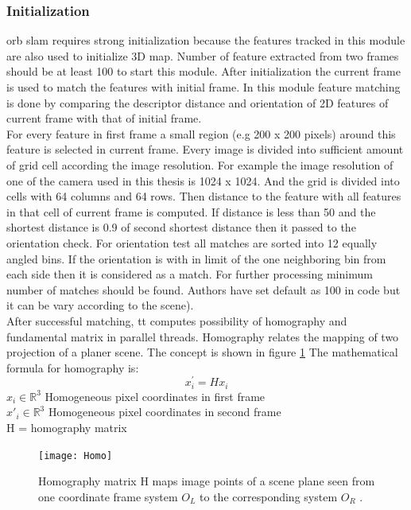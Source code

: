 \subsubsection{Initialization}
\acrshort{orb} \acrshort{slam} requires strong initialization because the features tracked in this module are also used to initialize 3D map. Number of feature extracted from two frames should be at least 100 to start this module. After initialization the current frame is used to match the features with initial frame. In this module feature matching is done by comparing the descriptor distance and orientation of 2D features of current frame with that of initial frame.\\
\linebreak
For every feature in first frame a small region (e.g 200 x 200 pixels) around this feature is selected in current frame. Every image is divided into sufficient amount of grid cell according the image resolution. For example the image resolution of one of the camera used in this thesis is 1024 x 1024. And the grid is divided into cells with 64 columns and 64 rows. Then distance to the feature with all features in that cell of current frame is computed. If distance is less than 50 and the shortest distance is 0.9 of second shortest distance then it passed to the orientation check. For orientation test all matches are sorted into 12 equally angled bins. If the orientation is with in limit of the one neighboring bin from each side then it is considered as a match. For further processing minimum number of matches should be found. Authors have set default as 100 in code but it can be vary according to the scene). \\
\linebreak
After successful matching, tt computes possibility of homography and fundamental matrix in parallel threads. Homography relates the mapping of two projection of a planer scene. The concept is shown in figure \ref{fig:h} The mathematical formula for homography is:
\begin{equation*}
    x^{'}_{i} = Hx_{i}    
\end{equation*}    
    $  x_{i} \in  \mathbb{R}^{3} $    Homogeneous pixel coordinates in first frame \\ 
    $  x{'}_{i} \in  \mathbb{R}^{3} $    Homogeneous pixel coordinates in second frame\\ 
    H  = homography matrix \\
\newline
\begin{figure}[h]
	\centering
	\texttt{[image: Homo]}
	\caption{Homography matrix H maps image points of a scene plane seen from one coordinate frame system $ O_{L} $ to the corresponding system $ O_{R} $ \cite{multiview}.}
	\label{fig:h}
\end{figure}
